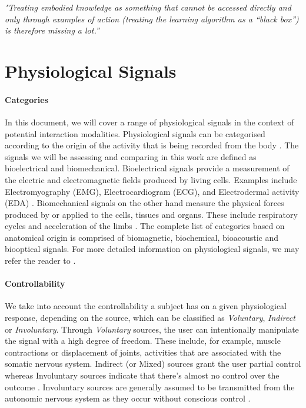 \textit{"Treating embodied knowledge as something that cannot be accessed directly and only through examples of action (treating the learning algorithm as a “black box”) is therefore missing a lot.” }

\citeauthor{gillies_understanding_2019} \cite{gillies_understanding_2019}

\section{Physiological Signals}

\paragraph{Categories}
\label{subsec:catagories}

In this document, we will cover a range of physiological signals in the context of potential interaction modalities. Physiological signals can be categorised according to the origin of the activity that is being recorded from the body \cite{enderle_introduction_2012}. The signals we will be assessing and comparing in this work are defined as bioelectrical and biomechanical. Bioelectrical signals provide a measurement of the electric and electromagnetic fields produced by living cells. Examples include Electromyography (EMG), Electrocardiogram (ECG), and Electrodermal activity (EDA) \cite{malmivuo_bioelectromagnetismprinciples_1995}. Biomechanical signals on the other hand measure the physical forces produced by or applied to the cells, tissues and organs. These include respiratory cycles and acceleration of the limbs \cite{guerreiro_bitalino_2013, pacelli_sensing_2006}. The complete list of categories based on anatomical origin is comprised of biomagnetic, biochemical, bioacoustic and biooptical signals. For more detailed information on physiological signals, we may refer the reader to \cite{webb_principles_2018}.

\paragraph{Controllability}

We take into account the controllability a subject has on a given physiological response, depending on the source, which can be classified as \textit{Voluntary}, \textit{Indirect} or \textit{Involuntary}. Through \textit{Voluntary} sources, the user can intentionally manipulate the signal with a high degree of freedom. These include, for example, muscle contractions or displacement of joints, activities that are associated with the somatic nervous system. Indirect (or Mixed) sources grant the user partial control whereas Involuntary sources indicate that there's almost no control over the outcome \cite{da_silva_biosignal_2017}. Involuntary sources are generally assumed to be transmitted from the autonomic nervous system as they occur without conscious control \cite{lenman_human_1975}.

